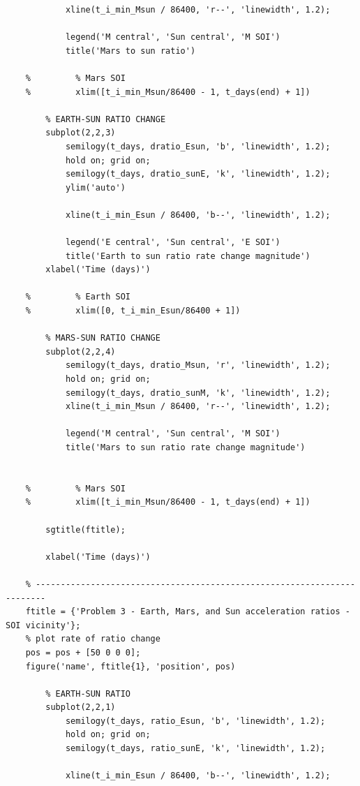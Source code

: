 \documentclass[conf]{new-aiaa}
\begin{document}
\begin{lstlisting}
            xline(t_i_min_Msun / 86400, 'r--', 'linewidth', 1.2); 
    
            legend('M central', 'Sun central', 'M SOI')
            title('Mars to sun ratio')
            
    %         % Mars SOI 
    %         xlim([t_i_min_Msun/86400 - 1, t_days(end) + 1])
            
        % EARTH-SUN RATIO CHANGE 
        subplot(2,2,3) 
            semilogy(t_days, dratio_Esun, 'b', 'linewidth', 1.2); 
            hold on; grid on; 
            semilogy(t_days, dratio_sunE, 'k', 'linewidth', 1.2); 
            ylim('auto') 
            
            xline(t_i_min_Esun / 86400, 'b--', 'linewidth', 1.2); 
            
            legend('E central', 'Sun central', 'E SOI')
            title('Earth to sun ratio rate change magnitude') 
        xlabel('Time (days)') 
    
    %         % Earth SOI 
    %         xlim([0, t_i_min_Esun/86400 + 1])
    
        % MARS-SUN RATIO CHANGE 
        subplot(2,2,4) 
            semilogy(t_days, dratio_Msun, 'r', 'linewidth', 1.2); 
            hold on; grid on; 
            semilogy(t_days, dratio_sunM, 'k', 'linewidth', 1.2); 
            xline(t_i_min_Msun / 86400, 'r--', 'linewidth', 1.2); 
            
            legend('M central', 'Sun central', 'M SOI')
            title('Mars to sun ratio rate change magnitude') 
    
    
    %         % Mars SOI 
    %         xlim([t_i_min_Msun/86400 - 1, t_days(end) + 1])
            
        sgtitle(ftitle); 
            
        xlabel('Time (days)') 
    
    % ------------------------------------------------------------------------
    ftitle = {'Problem 3 - Earth, Mars, and Sun acceleration ratios - SOI vicinity'}; 
    % plot rate of ratio change 
    pos = pos + [50 0 0 0]; 
    figure('name', ftitle{1}, 'position', pos)
    
        % EARTH-SUN RATIO 
        subplot(2,2,1) 
            semilogy(t_days, ratio_Esun, 'b', 'linewidth', 1.2); 
            hold on; grid on; 
            semilogy(t_days, ratio_sunE, 'k', 'linewidth', 1.2); 
    
            xline(t_i_min_Esun / 86400, 'b--', 'linewidth', 1.2); 
            

\end{lstlisting}
\end{document}
